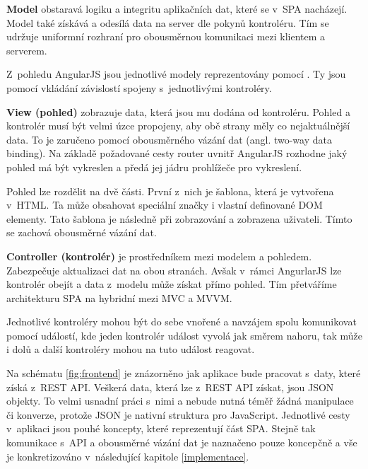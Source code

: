 \begin{description}
    \item {\bf Model} obstaravá logiku a integritu aplikačních dat, které se v~SPA nacházejí. Model také získává a odesílá data na server dle pokynů kontroléru. Tím se udržuje uniformní rozhraní pro obousměrnou komunikaci mezi klientem a serverem.

        Z~pohledu AngularJS jsou jednotlivé modely reprezentovány pomocí . Ty jsou pomocí vkládání závislostí spojeny s~jednotlivými kontroléry.

    \item {\bf View (pohled)} zobrazuje data, která jsou mu dodána od kontroléru. Pohled a kontrolér musí být velmi úzce propojeny, aby obě strany měly co nejaktuálnější data. To je zaručeno pomocí obousměrného vázání dat (angl. two-way data binding). Na základě požadované cesty router uvnitř AngularJS rozhodne jaký pohled má být vykreslen a předá jej jádru prohlížeče pro vykreslení.

        Pohled lze rozdělit na dvě části. První z~nich je šablona, která je vytvořena v~HTML. Ta může obsahovat speciální značky i vlastní definované DOM elementy. Tato šablona je následně při zobrazování  a zobrazena uživateli. Tímto se zachová obousměrné vázání dat.

    \item {\bf Controller (kontrolér)} je prostředníkem mezi modelem a pohledem. Zabezpečuje aktualizaci dat na obou stranách. Avšak v~rámci AngurlarJS lze kontrolér obejít a data z~modelu může získat přímo pohled. Tím přetváříme architekturu SPA na hybridní mezi MVC a MVVM.

        Jednotlivé kontroléry mohou být do sebe vnořené a navzájem spolu komunikovat pomocí událostí, kde jeden kontrolér událost vyvolá jak směrem nahoru, tak může i dolů a další kontroléry mohou na tuto událost reagovat.
\end{description}

Na schématu \ref{fig:frontend} je znázorněno jak aplikace bude pracovat s~daty, které získá z~REST API. Veškerá data, která lze z~REST API získat, jsou JSON objekty. To velmi usnadní práci s~nimi a nebude nutná téměř žádná manipulace či konverze, protože JSON je nativní struktura pro JavaScript. Jednotlivé cesty v~aplikaci jsou pouhé koncepty, které reprezentují část SPA. Stejně tak komunikace s~API a obousměrné vázání dat je naznačeno pouze koncepčně a vše je konkretizováno v~následující kapitole \ref{implementace}.

